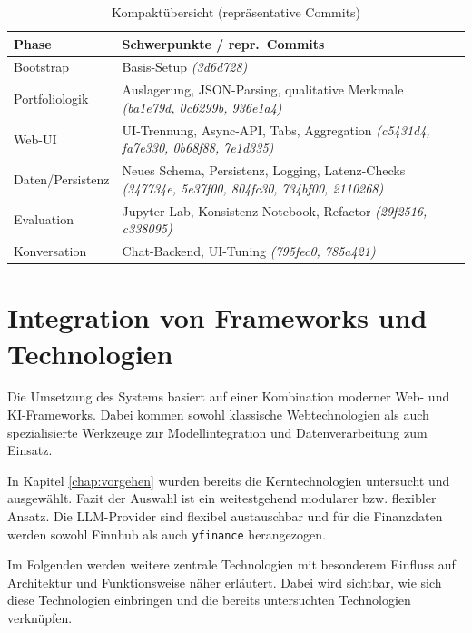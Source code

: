     \begin{table}[H]
      \begin{center}
      \renewcommand{\arraystretch}{1.12}
      \begin{tabular}{@{}lp{9.4cm}@{}}
      \toprule
      \textbf{Phase} & \textbf{Schwerpunkte / repr.\ Commits} \\
      \midrule
      Bootstrap & Basis-Setup \emph{(3d6d728)} \\
      Portfoliologik & Auslagerung, JSON-Parsing, qualitative Merkmale \emph{(ba1e79d, 0c6299b, 936e1a4)} \\
      Web-UI & UI-Trennung, Async-API, Tabs, Aggregation \emph{(c5431d4, fa7e330, 0b68f88, 7e1d335)} \\
      Daten/Persistenz & Neues Schema, Persistenz, Logging, Latenz-Checks \emph{(347734e, 5e37f00, 804fc30, 734bf00, 2110268)} \\
      Evaluation & Jupyter-Lab, Konsistenz-Notebook, Refactor \emph{(29f2516, c338095)} \\
      Konversation & Chat-Backend, UI-Tuning \emph{(795fec0, 785a421)} \\
      \bottomrule
      \end{tabular}
      \end{center}
        \caption{Kompaktübersicht (repräsentative Commits)}
        \label{tab:kompaktübersicht}
    \end{table}

  \section{Integration von Frameworks und Technologien}

    Die Umsetzung des Systems basiert auf einer Kombination moderner Web- und \acs{KI}-Frameworks.
    Dabei kommen sowohl klassische Webtechnologien als auch spezialisierte Werkzeuge zur Modellintegration und Datenverarbeitung zum Einsatz.

    In Kapitel \ref{chap:vorgehen} wurden bereits die Kerntechnologien untersucht und ausgewählt.
    Fazit der Auswahl ist ein weitestgehend modularer bzw. flexibler Ansatz.
    Die \acs{LLM}-Provider sind flexibel austauschbar und für die Finanzdaten werden sowohl Finnhub als auch \texttt{yfinance} herangezogen.

    Im Folgenden werden weitere zentrale Technologien mit besonderem Einfluss auf Architektur und Funktionsweise näher erläutert.
    Dabei wird sichtbar, wie sich diese Technologien einbringen und die bereits untersuchten Technologien verknüpfen.

